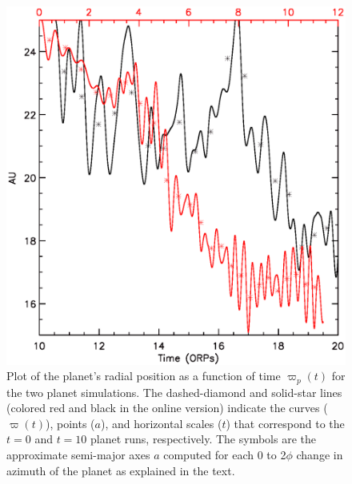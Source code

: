 \documentclass[12pt,manuscript,authoryear]{aastex}
\begin{document}
\begin{figure}[t]
\center
\includegraphics[width=12cm]{Figures/planeta.eps}
\caption{Plot of the planet's radial position as a function of time $\varpi_p(t)$ for the two planet simulations. The dashed-diamond and solid-star lines (colored red and black in the online version) indicate the curves ($\varpi(t)$), points ($a$), and horizontal scales ($t$) that correspond to the $t = 0$ and $t = 10$ planet runs, respectively. The symbols are the approximate semi-major axes $a$ computed for each 0 to 2$\phi$ change in azimuth of the planet as explained in the text.}
\label{fig:a}
\end{figure}
\end{document}
